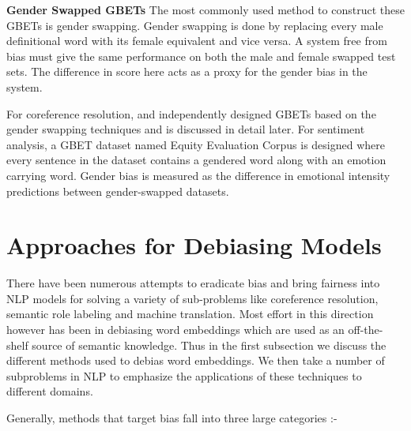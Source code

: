 \documentclass[11pt,a4paper]{article}
\begin{document}
\begin{enumerate}
    \textbf{Gender Swapped GBETs} The most commonly used method to construct these GBETs is gender swapping. Gender swapping is done by replacing every male definitional word with its female equivalent and vice versa. A system free from bias must give the same performance on both the male and female swapped test sets. The difference in score here acts as a proxy for the gender bias in the system.
    
    For coreference resolution, \citet{rudinger-etal-2018-gender} and \citet{zhao-etal-2018-gender} independently designed GBETs based on the gender swapping techniques and is discussed in detail later. For sentiment analysis, a GBET dataset named Equity Evaluation Corpus \cite{kiritchenko-mohammad-2017-best} is designed where every sentence in the dataset contains a gendered word along with an emotion carrying word. Gender bias is measured as the difference in emotional intensity predictions between gender-swapped datasets.
\end{enumerate}
\section{Approaches for Debiasing Models}
\label{sec:debias}
There have been numerous attempts to eradicate bias and bring fairness into NLP models for solving a variety of sub-problems like coreference resolution, semantic role labeling and machine translation. Most effort in this direction however has been in debiasing word embeddings which are used as an off-the-shelf source of semantic knowledge. Thus in the first subsection we discuss the different methods used to debias word embeddings. We then take a number of subproblems in NLP to emphasize the applications of these techniques to different domains.

Generally, methods that target bias fall into three large categories :-
\end{document}
